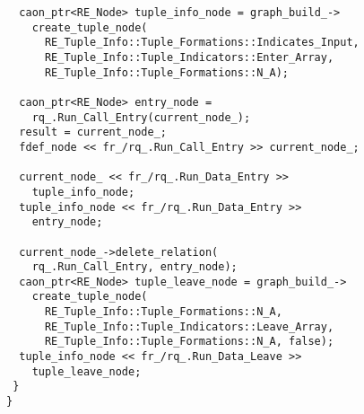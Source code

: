 \begin{lstlisting}
  caon_ptr<RE_Node> tuple_info_node = graph_build_->
    create_tuple_node(
      RE_Tuple_Info::Tuple_Formations::Indicates_Input,
      RE_Tuple_Info::Tuple_Indicators::Enter_Array, 
      RE_Tuple_Info::Tuple_Formations::N_A);
	
  caon_ptr<RE_Node> entry_node = 
    rq_.Run_Call_Entry(current_node_);
  result = current_node_;
  fdef_node << fr_/rq_.Run_Call_Entry >> current_node_;
  
  current_node_ << fr_/rq_.Run_Data_Entry >> 
    tuple_info_node;
  tuple_info_node << fr_/rq_.Run_Data_Entry >> 
    entry_node;
	
  current_node_->delete_relation(
    rq_.Run_Call_Entry, entry_node);
  caon_ptr<RE_Node> tuple_leave_node = graph_build_->
    create_tuple_node(
      RE_Tuple_Info::Tuple_Formations::N_A,
      RE_Tuple_Info::Tuple_Indicators::Leave_Array, 
      RE_Tuple_Info::Tuple_Formations::N_A, false);
  tuple_info_node << fr_/rq_.Run_Data_Leave >> 
    tuple_leave_node;
 }
}

\end{lstlisting}


